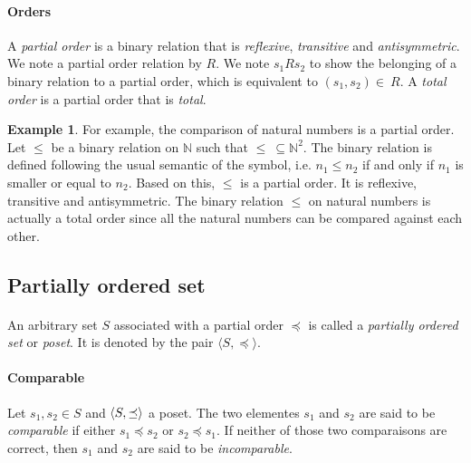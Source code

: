 \documentclass[letterpaper]{article}
\DeclarePairedDelimiter{\tuple}{\langle}{\rangle}
\theoremstyle{definition}
\newtheorem{example}{Example}[subsection]
\begin{document}
\paragraph{Orders}

A \textit{partial order} is a binary relation that is \textit{reflexive},
\textit{transitive} and \textit{antisymmetric}. We note a
partial order relation by $R$.
We note $s_1 R  s_2$ to show the belonging of
a binary relation to a partial order, which is equivalent
to $(s_1, s_2) \in \ R$.
A \textit{total order} is a partial order that is \textit{total}.

\begin{example}

For example, the comparison of natural numbers is a partial order.
Let $\leq$ be a binary relation on $\mathbb{N}$
such that $\leq \ \subseteq \mathbb{N}^2$. The binary relation is defined
following the usual semantic of the symbol, i.e. $n_1 \leq n_2$ if and
only if $n_1$ is smaller or equal to $n_2$.
Based on this, $\leq$ is a partial order. It is
reflexive, transitive and antisymmetric.
The binary relation $\leq$ on natural numbers is actually a total
order since all the natural numbers can be compared against each other.

\end{example}

\subsection{Partially ordered set}

\paragraph{}

An arbitrary set $S$ associated with a partial order $\preceq$
is called a \textit{partially ordered set} or \textit{poset}.
It is denoted by the pair $\langle S, \preceq \rangle$.

\paragraph{Comparable}

Let $s_1, s_2 \in S$ and $\tuple{S, \preceq}$ a poset.
The two elementes $s_1$ and $s_2$ are said to be \textit{comparable} if either
$s_1 \preceq s_2$ or $s_2 \preceq s_1$. If neither of those two comparaisons
are correct, then $s_1$ and $s_2$ are said to be \textit{incomparable}.
\end{document}
